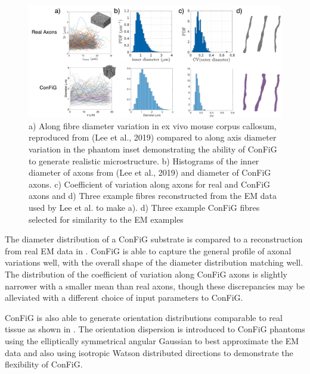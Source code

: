 \begin{figure}
  \centering
  \includegraphics[width=\textwidth]{figures/config/diameter_dist_NEW_whitebg.png}
  \caption[Diameter distributions of real and ConFiG axons]{a) Along fibre diameter variation in ex vivo mouse corpus callosum, reproduced from (Lee et al., 2019) compared to along axis diameter variation in the phantom inset demonstrating the ability of ConFiG to generate realistic microstructure. b) Histograms of the inner diameter of axons from (Lee et al., 2019) and diameter of ConFiG axons. c) Coefficient of variation along axons for real and ConFiG axons and d) Three example fibres reconstructed from the EM data used by Lee et al. to make a). d) Three example ConFiG fibres selected for similarity to the EM examples }
  \label{fig:config_res_diameter_dist}
\end{figure}

The diameter distribution of a ConFiG substrate is compared to a reconstruction from real EM data \cite{Lee2019b} in . ConFiG is able to capture the general profile of axonal variations well, with the overall shape of the diameter distribution matching well. The distribution of the coefficient of variation along ConFiG axons is slightly narrower with a smaller mean than real axons, though these discrepancies may be alleviated with a different choice of input parameters to ConFiG.

ConFiG is also able to generate orientation distributions comparable to real tissue as shown in . The orientation dispersion is introduced to ConFiG phantoms using the elliptically symmetrical angular Gaussian \cite{Paine2018} to best approximate the EM data and also using isotropic Watson distributed directions to demonstrate the flexibility of ConFiG.

